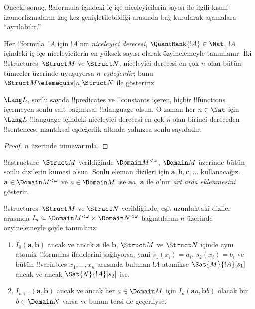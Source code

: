 \documentclass[../../../include/open-logic-section]{subfiles}
\begin{document}
Önceki sonuç, !!a{formula} içindeki iç içe niceleyicilerin sayısı ile
ilgili kısmi izomorfizmaların kaç kez genişletilebildiği arasında bağ
kurularak aşamalara ``ayrılabilir.''

\begin{defn}
  Her !!{formula}~$!A$ için $!A$'nın \emph{niceleyici derecesi},
  $\QuantRank{!A}\in\Nat$, $!A$ içindeki iç içe niceleyicilerin en
  yüksek sayısı olarak özyinelemeyle tanımlanır. İki
  !!{structure}s~$\Struct M$ ve $\Struct N$, niceleyici derecesi en çok
  $n$ olan bütün tümceler üzerinde uyuşuyorsa \emph{$n$-eşdeğerdir};
  bunu $\Struct M\elemequiv[n]\Struct N$ ile gösteririz.
\end{defn}

\begin{prop}
  $\Lang L$, sonlu sayıda !!{predicate}s ve !!{constant}s içeren,
  hiçbir !!{function}s içermeyen sonlu salt bağıntısal !!a{language}
  olsun. O zaman her $n\in\Nat$ için $\Lang L$ !!{language} içindeki
  niceleyici derecesi en çok $n$ olan birinci dereceden
  !!{sentence}s, mantıksal eşdeğerlik altında yalnızca sonlu sayıdadır.
\end{prop}

\begin{proof}
  $n$ üzerinde tümevarımla.
\end{proof}

\begin{defn}
  !!a{structure}~$\Struct M$ verildiğinde $\Domain M^{<\omega}$,
  $\Domain M$ üzerinde bütün sonlu dizilerin kümesi olsun. Sonlu eleman
  dizileri için $\mathbf a,\mathbf b,\mathbf c,\ldots$ kullanacağız.
  $\mathbf a\in\Domain M^{<\omega}$ ve $a\in\Domain M$ ise
  $\mathbf aa$, $\mathbf a$ ile $a$'nın \emph{art arda eklenmesini}
  gösterir.
\end{defn}

\begin{defn}
  !!{structure}s~$\Struct M$ ve $\Struct N$ verildiğinde, eşit
  uzunluktaki diziler arasında
  $I_n\subseteq\Domain M^{<\omega}\times\Domain N^{<\omega}$
  bağıntılarını $n$ üzerinde özyinelemeyle şöyle tanımlarız:
   \begin{enumerate}
   \item $I_0(\mathbf a,\mathbf b)$ ancak ve ancak $\mathbf a$ ile
     $\mathbf b$, $\Struct M$ ve $\Struct N$ içinde aynı atomik
     !!{formula}s ifadelerini sağlıyorsa; yani $s_1(x_i)=a_i$,
     $s_2(x_i)=b_i$ ve bütün !!{variable}s $x_1,\dots,x_n$ arasında
     bulunan $!A$ atomikse $\Sat{M}{!A}[s_1]$ ancak ve ancak
     $\Sat{N}{!A}[s_2]$ ise.
   \item $I_{n+1}(\mathbf a,\mathbf b)$ ancak ve ancak her
     $a\in\Domain M$ için $I_n(\mathbf aa,\mathbf bb)$ olacak bir
     $b\in\Domain N$ varsa ve bunun tersi de geçerliyse.
   \end{enumerate}
\end{defn}
\end{document}
